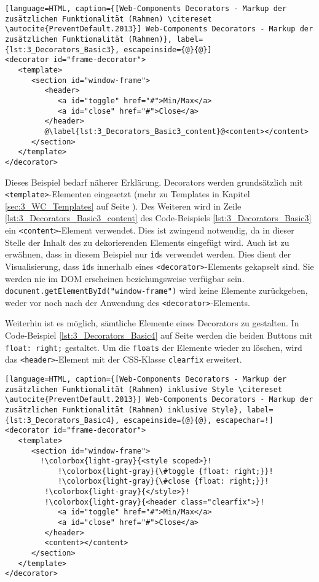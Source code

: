 {\begin{lstlisting}[language=HTML, caption={[Web-Components Decorators - Markup der zusätzlichen Funktionalität (Rahmen) \citereset \autocite{PreventDefault.2013}] Web-Components Decorators - Markup der zusätzlichen Funktionalität (Rahmen)}, label={lst:3_Decorators_Basic3}, escapeinside={@}{@}]
<decorator id="frame-decorator">
   <template>
      <section id="window-frame">
         <header>
            <a id="toggle" href="#">Min/Max</a>
            <a id="close" href="#">Close</a>
         </header>
         @\label{lst:3_Decorators_Basic3_content}@<content></content>
      </section>
   </template>
</decorator>
\end{lstlisting}

Dieses Beispiel bedarf näherer Erklärung. Decorators werden grundsätzlich mit \lstinline|<template>|-Elementen eingesetzt (mehr zu Templates in Kapitel \ref{sec:3_WC_Templates} auf Seite \pageref{sec:3_WC_Templates}). Des Weiteren wird in Zeile \ref{lst:3_Decorators_Basic3_content} des Code-Beispiels \ref{lst:3_Decorators_Basic3} ein \lstinline|<content>|-Element verwendet. Dies ist zwingend notwendig, da in dieser Stelle der Inhalt des zu dekorierenden Elements eingefügt wird. Auch ist zu erwähnen, dass in diesem Beispiel nur \lstinline|id|s verwendet werden. Dies dient der Visualisierung, dass \lstinline|id|s innerhalb eines \lstinline|<decorator>|-Elements gekapselt sind. Sie werden nie im DOM erscheinen beziehungsweise verfügbar sein. \lstinline|document.getElementById("window-frame")| wird keine Elemente zurückgeben, weder vor noch nach der Anwendung des \lstinline|<decorator>|-Elements.

Weiterhin ist es möglich, sämtliche Elemente eines Decorators zu gestalten. In Code-Beispiel \ref{lst:3_Decorators_Basic4} auf Seite \pageref{lst:3_Decorators_Basic4} werden die beiden Buttons mit \lstinline|float: right;| gestaltet. Um die \lstinline|floats| der Elemente wieder zu löschen, wird das \lstinline|<header>|-Element mit der CSS-Klasse \lstinline|clearfix| erweitert.

\begin{lstlisting}[language=HTML, caption={[Web-Components Decorators - Markup der zusätzlichen Funktionalität (Rahmen) inklusive Style \citereset \autocite{PreventDefault.2013}] Web-Components Decorators - Markup der zusätzlichen Funktionalität (Rahmen) inklusive Style}, label={lst:3_Decorators_Basic4}, escapeinside={@}{@}, escapechar=!]
<decorator id="frame-decorator">
   <template>
      <section id="window-frame">
        !\colorbox{light-gray}{<style scoped>}!
            !\colorbox{light-gray}{\#toggle {float: right;}}!
            !\colorbox{light-gray}{\#close {float: right;}}!
         !\colorbox{light-gray}{</style>}!
         !\colorbox{light-gray}{<header class="clearfix">}!
            <a id="toggle" href="#">Min/Max</a>
            <a id="close" href="#">Close</a>
         </header>
         <content></content>
      </section>
   </template>
</decorator>
\end{lstlisting}

}
